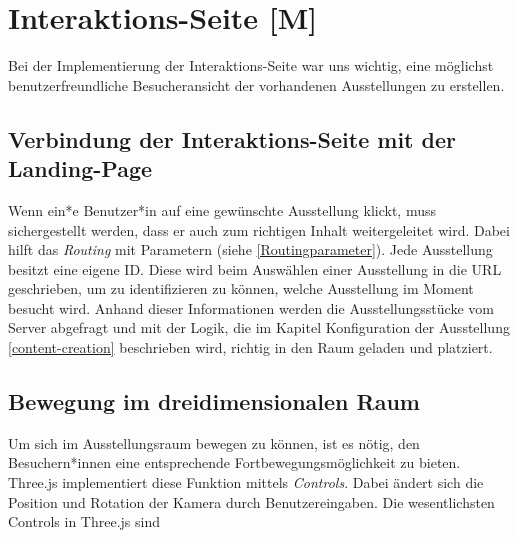 \section{Interaktions-Seite [M]}

Bei der Implementierung der Interaktions-Seite war uns wichtig, eine möglichst benutzerfreundliche Besucheransicht der vorhandenen Ausstellungen zu erstellen. 

\subsection{Verbindung der Interaktions-Seite mit der Landing-Page
}
Wenn ein*e Benutzer*in auf eine gewünschte Ausstellung klickt, muss sichergestellt werden, dass er auch zum richtigen Inhalt weitergeleitet wird. Dabei hilft das \emph{Routing} mit Parametern (siehe \ref{Routingparameter}). Jede Ausstellung besitzt eine eigene ID. Diese wird beim Auswählen einer Ausstellung in die URL geschrieben, um zu identifizieren zu können, welche Ausstellung im Moment besucht wird. Anhand dieser Informationen werden die Ausstellungsstücke vom Server abgefragt und mit der Logik, die im Kapitel Konfiguration der Ausstellung \ref{content-creation} beschrieben wird, richtig in den Raum geladen und platziert.

\subsection{Bewegung im dreidimensionalen Raum}
\label{controls}
Um sich im Ausstellungsraum bewegen zu können, ist es nötig, den Besuchern*innen eine entsprechende Fortbewegungsmöglichkeit zu bieten. Three.js implementiert diese Funktion mittels \emph{Controls}. Dabei ändert sich die Position und Rotation der Kamera durch Benutzereingaben. Die wesentlichsten Controls in Three.js sind

